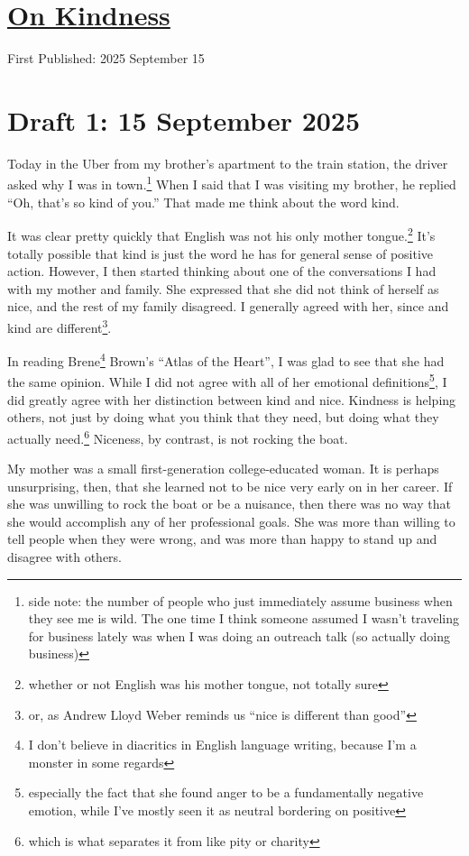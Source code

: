 \documentclass[12pt]{article}
\newcommand{\say}[1]{``#1''}
\renewcommand{\,}{\textsuperscript{,}}
\begin{document}
  
\doublespacing  
\section{\href{kindness.html}{On Kindness}}  
First Published: 2025 September 15

\section{Draft 1: 15 September 2025}
Today in the Uber from my brother's apartment to the train station, the driver asked why I was in town.\footnote{side note: the number of people who just immediately assume business when they see me is wild.
The one time I think someone assumed I wasn't traveling for business lately was when I was doing an outreach talk (so actually doing business)}
When I said that I was visiting my brother, he replied \say{Oh, that's so kind of you.}
That made me think about the word kind.

It was clear pretty quickly that English was not his only mother tongue.\footnote{whether or not English was his mother tongue, not totally sure}
It's totally possible that kind is just the word he has for general sense of positive action.
However, I then started thinking about one of the conversations I had with my mother and family.
She expressed that she did not think of herself as nice, and the rest of my family disagreed.
I generally agreed with her, since and kind are different\footnote{or, as Andrew Lloyd Weber reminds us \say{nice is different than good}}.

In reading Brene\footnote{I don't believe in diacritics in English language writing, because I'm a monster in some regards} Brown's \say{Atlas of the Heart}, I was glad to see that she had the same opinion.
While I did not agree with all of her emotional definitions\footnote{especially the fact that she found anger to be a fundamentally negative emotion, while I've mostly seen it as neutral bordering on positive}, I did greatly agree with her distinction between kind and nice.
Kindness is helping others, not just by doing what you think that they need, but doing what they actually need.\footnote{which is what separates it from like pity or charity}
Niceness, by contrast, is not rocking the boat.

My mother was a small first-generation college-educated woman.
It is perhaps unsurprising, then, that she learned not to be nice very early on in her career.
If she was unwilling to rock the boat or be a nuisance, then there was no way that she would accomplish any of her professional goals.
She was more than willing to tell people when they were wrong, and was more than happy to stand up and disagree with others.
\end{document}
